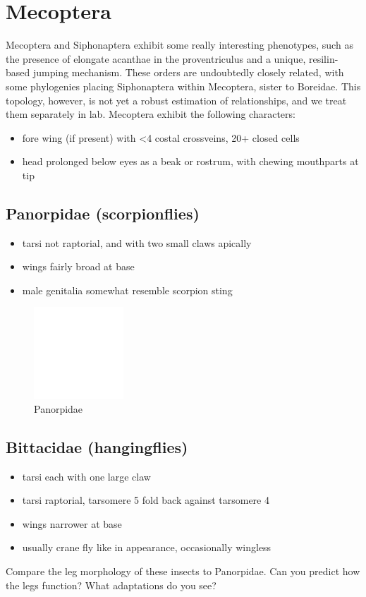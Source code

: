 \documentclass[letterpaper, 11pt]{article}
\begin{document}
\section{Mecoptera}
Mecoptera and Siphonaptera exhibit some really interesting phenotypes, such as the presence of elongate acanthae in the proventriculus and a unique, resilin-based jumping mechanism. These orders are undoubtedly closely related, with some phylogenies placing Siphonaptera within Mecoptera, sister to Boreidae. This topology, however, is not yet a robust estimation of relationships, and we treat them separately in lab. Mecoptera exhibit the following characters:
\begin{itemize}
\item fore wing (if present) with \textless4 costal crossveins, 20+ closed cells
\item head prolonged below eyes as a beak or rostrum, with chewing mouthparts at tip
\end{itemize}

\subsection{Panorpidae (scorpionflies)}
\begin{itemize}
\item tarsi not raptorial, and with two small claws apically
\item wings fairly broad at base
\item male genitalia somewhat resemble scorpion sting
\end{itemize}

\begin{figure}[ht!]
  \centering
    \includegraphics[width=0.3\textwidth]{blank}
  \caption{Panorpidae}
  \label{fig:panorpid}
\end{figure}

\subsection{Bittacidae (hangingflies)}
\begin{itemize}
\item tarsi each with one large claw
\item tarsi raptorial, tarsomere 5 fold back against tarsomere 4
\item wings narrower at base
\item usually crane fly like in appearance, occasionally wingless
\end{itemize}
Compare the leg morphology of these insects to Panorpidae. Can you predict how the legs function? What adaptations do you see?\vspace{3cm}
\end{document}
